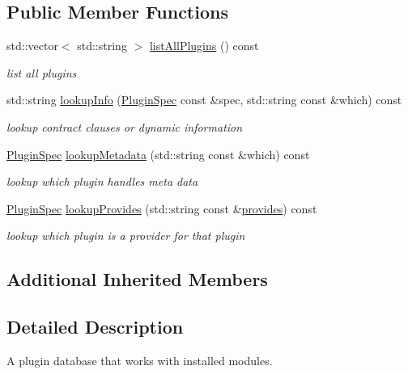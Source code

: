 \subsection*{Public Member Functions}
\begin{DoxyCompactItemize}
\item 
std\+::vector$<$ std\+::string $>$ \hyperlink{classkdb_1_1tools_1_1ModulesPluginDatabase_a0aa3ca734a18da8f3818e0278697eaef}{list\+All\+Plugins} () const 
\begin{DoxyCompactList}\small\item\em list all plugins \end{DoxyCompactList}\item 
std\+::string \hyperlink{classkdb_1_1tools_1_1ModulesPluginDatabase_a3d06a4b33e4bcc879dd6f562a8876390}{lookup\+Info} (\hyperlink{classkdb_1_1tools_1_1PluginSpec}{Plugin\+Spec} const \&spec, std\+::string const \&which) const 
\begin{DoxyCompactList}\small\item\em lookup contract clauses or dynamic information \end{DoxyCompactList}\item 
\hyperlink{classkdb_1_1tools_1_1PluginSpec}{Plugin\+Spec} \hyperlink{classkdb_1_1tools_1_1ModulesPluginDatabase_a7a7ccedd922ce214c61495e7a3ec26b9}{lookup\+Metadata} (std\+::string const \&which) const 
\begin{DoxyCompactList}\small\item\em lookup which plugin handles meta data \end{DoxyCompactList}\item 
\hyperlink{classkdb_1_1tools_1_1PluginSpec}{Plugin\+Spec} \hyperlink{classkdb_1_1tools_1_1ModulesPluginDatabase_a24007d69527e5139c2dbb2004bf7a8d0}{lookup\+Provides} (std\+::string const \&\hyperlink{classkdb_1_1tools_1_1PluginDatabase_afc91ff760616ee83c6afb70e5a2f0601a73ff10d6a07213c277db4326b3df6c4b}{provides}) const 
\begin{DoxyCompactList}\small\item\em lookup which plugin is a provider for that plugin \end{DoxyCompactList}\end{DoxyCompactItemize}
\subsection*{Additional Inherited Members}


\subsection{Detailed Description}
A plugin database that works with installed modules. 

